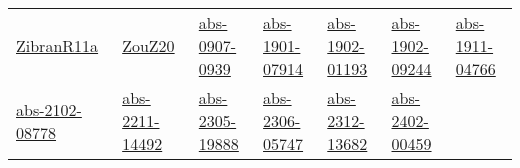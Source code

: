 {\begin{longtable}{*{7}{l}}
\href{works/ZibranR11a.pdf}{ZibranR11a}~\cite{ZibranR11a} & \href{works/ZouZ20.pdf}{ZouZ20}~\cite{ZouZ20} & \href{works/abs-0907-0939.pdf}{abs-0907-0939}~\cite{abs-0907-0939} & \href{works/abs-1901-07914.pdf}{abs-1901-07914}~\cite{abs-1901-07914} & \href{works/abs-1902-01193.pdf}{abs-1902-01193}~\cite{abs-1902-01193} & \href{works/abs-1902-09244.pdf}{abs-1902-09244}~\cite{abs-1902-09244} & \href{works/abs-1911-04766.pdf}{abs-1911-04766}~\cite{abs-1911-04766}\\ 
\href{works/abs-2102-08778.pdf}{abs-2102-08778}~\cite{abs-2102-08778} & \href{works/abs-2211-14492.pdf}{abs-2211-14492}~\cite{abs-2211-14492} & \href{works/abs-2305-19888.pdf}{abs-2305-19888}~\cite{abs-2305-19888} & \href{works/abs-2306-05747.pdf}{abs-2306-05747}~\cite{abs-2306-05747} & \href{works/abs-2312-13682.pdf}{abs-2312-13682}~\cite{abs-2312-13682} & \href{works/abs-2402-00459.pdf}{abs-2402-00459}~\cite{abs-2402-00459} & \end{longtable}
}

